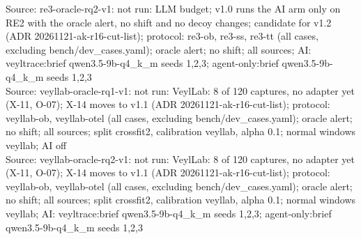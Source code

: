 \begin{table}[t]
Source: re3-oracle-rq2-v1: not run: LLM budget; v1.0 runs the AI arm only on RE2 with the oracle alert, no shift and no decoy changes; candidate for v1.2 (ADR 20261121-ak-r16-cut-list); protocol: re3-ob, re3-ss, re3-tt (all cases, excluding bench/dev\_cases.yaml); oracle alert; no shift; all sources; AI: veyltrace:brief qwen3.5-9b-q4\_k\_m seeds 1,2,3; agent-only:brief qwen3.5-9b-q4\_k\_m seeds 1,2,3\\
Source: veyllab-oracle-rq1-v1: not run: VeylLab: 8 of 120 captures, no adapter yet (X-11, O-07); X-14 moves to v1.1 (ADR 20261121-ak-r16-cut-list); protocol: veyllab-ob, veyllab-otel (all cases, excluding bench/dev\_cases.yaml); oracle alert; no shift; all sources; split crossfit2, calibration veyllab, alpha 0.1; normal windows veyllab; AI off\\
Source: veyllab-oracle-rq2-v1: not run: VeylLab: 8 of 120 captures, no adapter yet (X-11, O-07); X-14 moves to v1.1 (ADR 20261121-ak-r16-cut-list); protocol: veyllab-ob, veyllab-otel (all cases, excluding bench/dev\_cases.yaml); oracle alert; no shift; all sources; split crossfit2, calibration veyllab, alpha 0.1; normal windows veyllab; AI: veyltrace:brief qwen3.5-9b-q4\_k\_m seeds 1,2,3; agent-only:brief qwen3.5-9b-q4\_k\_m seeds 1,2,3\\
\end{table}
